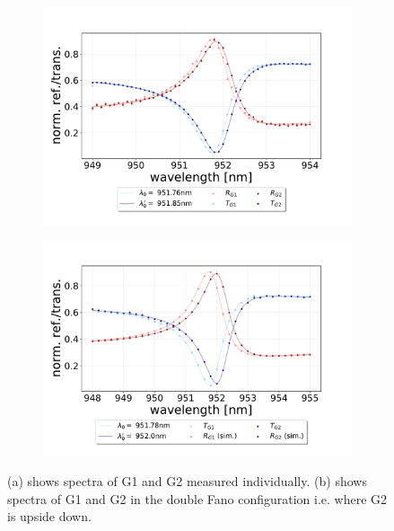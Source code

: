 \begin{figure}[h!]
    \centering
    \begin{subfigure}[b]{0.49\textwidth}
        \includegraphics[width=\textwidth]{figures/results/M3:M5/M3:M5_initial_spectra.pdf}
        \caption{}
        \label{fig:G1_and_G2_initial_discussion}
    \end{subfigure}
    \begin{subfigure}[b]{0.49\textwidth}
        \includegraphics[width=\textwidth]{figures/results/M3:M5/M3:M5_spectra_at_measurement.pdf}
        \caption{}
        \label{fig:G1_and_G2_double_fano_config_discussion}
    \end{subfigure}
    \caption{(a) shows spectra of G1 and G2 measured individually. (b) shows spectra of G1 and G2 in the double Fano configuration i.e. where G2 is upside down.}
    \label{fig:G1_and_G2_spectra_individual_and_in_double_fano_config}
\end{figure}

